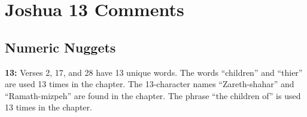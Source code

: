 \section{Joshua 13 Comments}

\subsection{Numeric Nuggets}
\textbf{13: } Verses 2, 17, and 28 have 13 unique words. The words ``children'' and ``thier'' are used 13 times in the chapter. The 13-character names ``Zareth-shahar'' and  ``Ramath-mizpeh'' are found in the chapter. The phrase ``the children of'' is used 13 times in the chapter.

